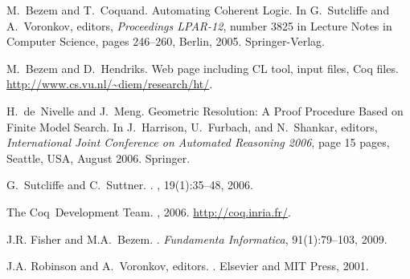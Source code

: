 \documentclass[a4paper,11pt]{article}
\begin{document}
\begin{thebibliography}{10}

M.~Bezem and T.~Coquand.
\newblock Automating {C}oherent {L}ogic.
\newblock In G.~Sutcliffe and A.~Voronkov, editors, {\em Proceedings LPAR-12},
  number 3825 in Lecture Notes in Computer Science, pages 246--260, Berlin,
  2005. Springer-Verlag.

M.~Bezem and D.~Hendriks.
\newblock Web page including {CL} tool, input files, {C}oq files.
\newblock \mbox{\url{http://www.cs.vu.nl/~diem/research/ht/}}.

H.~de~Nivelle and J.~Meng.
\newblock Geometric {R}esolution: {A} {P}roof {P}rocedure {B}ased on {F}inite
  {M}odel {S}earch.
\newblock In J.~Harrison, U.~Furbach, and N.~Shankar, editors, {\em
  International Joint Conference on Automated Reasoning 2006}, page 15 pages,
  Seattle, USA, August 2006. Springer.

G.~Sutcliffe and C.~Suttner.
.
, 19(1):35--48, 2006.

The Coq~Development Team.
, 2006.
\newblock \url{http://coq.inria.fr/}.

J.R. Fisher and M.A.~Bezem.
.
\newblock\emph{Fundamenta Informatica},
91(1):79--103, 2009.

J.A. Robinson and A.~Voronkov, editors.
.
\newblock Elsevier and MIT Press, 2001.

\end{thebibliography}
\end{document}
